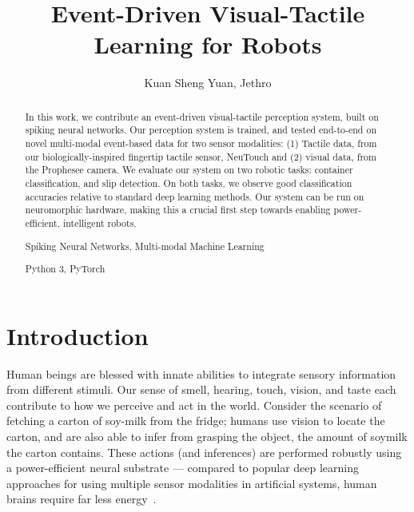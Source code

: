 \documentclass[fyp]{socreport}
\begin{document}
\author{Kuan Sheng Yuan, Jethro}
\title{Event-Driven Visual-Tactile Learning for Robots}
\maketitle

\begin{abstract}
  In this work, we contribute an event-driven visual-tactile perception system,
  built on spiking neural networks. Our perception system is trained, and tested
  end-to-end on novel multi-modal event-based data for two sensor modalities:
  (1) Tactile data, from our biologically-inspired fingertip tactile sensor,
  NeuTouch and (2) visual data, from the Prophesee camera. We evaluate our
  system on two robotic tasks: container classification, and slip detection. On
  both tasks, we observe good classification accuracies relative to standard
  deep learning methods. Our system can be run on neuromorphic hardware, making
  this a crucial first step towards enabling power-efficient, intelligent
  robots.

  \begin{keywords}
    Spiking Neural Networks, Multi-modal Machine Learning
  \end{keywords}

  \begin{implement} Python 3, PyTorch
  \end{implement}
\end{abstract}

\tableofcontents

\chapter{Introduction}

Human beings are blessed with innate abilities to integrate sensory information
from different stimuli. Our sense of smell, hearing, touch, vision, and taste
each contribute to how we perceive and act in the world. Consider the scenario
of fetching a carton of soy-milk from the fridge; humans use vision to locate
the carton, and are also able to infer from grasping the object, the amount of
soymilk the carton contains. These actions (and inferences) are performed
robustly using a power-efficient neural substrate --- compared to popular deep
learning approaches for using multiple sensor modalities in artificial systems,
human brains require far less energy~\cite{li2016energyefficiency}.
\end{document}
